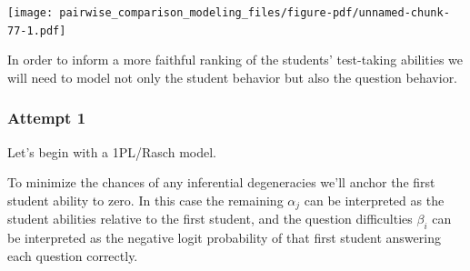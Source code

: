 \documentclass[
  letterpaper,
  DIV=11,
  numbers=noendperiod]{scrartcl}
\newenvironment{Shaded}{\begin{snugshade}}{\end{snugshade}}
\newcommand{\AttributeTok}[1]{\textcolor[rgb]{0.40,0.45,0.13}{#1}}
\newcommand{\DecValTok}[1]{\textcolor[rgb]{0.68,0.00,0.00}{#1}}
\newcommand{\FunctionTok}[1]{\textcolor[rgb]{0.28,0.35,0.67}{#1}}
\newcommand{\NormalTok}[1]{\textcolor[rgb]{0.00,0.23,0.31}{#1}}
\newcommand{\SpecialCharTok}[1]{\textcolor[rgb]{0.37,0.37,0.37}{#1}}
\newcommand{\StringTok}[1]{\textcolor[rgb]{0.13,0.47,0.30}{#1}}
\begin{document}
\begin{Shaded}
\end{Shaded}

\texttt{[image: pairwise\_comparison\_modeling\_files/figure-pdf/unnamed-chunk-77-1.pdf]}

In order to inform a more faithful ranking of the students' test-taking
abilities we will need to model not only the student behavior but also
the question behavior.

\subsubsection{Attempt 1}\label{attempt-1-1}

Let's begin with a 1PL/Rasch model.

To minimize the chances of any inferential degeneracies we'll anchor the
first student ability to zero. In this case the remaining \(\alpha_{j}\)
can be interpreted as the student abilities relative to the first
student, and the question difficulties \(\beta_{i}\) can be interpreted
as the negative logit probability of that first student answering each
question correctly.
\end{document}
